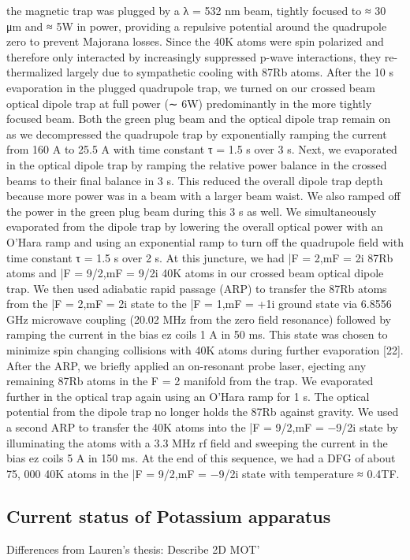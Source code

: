 the magnetic trap was plugged by a λ = 532 nm beam, tightly focused to ≈ 30 μm
and ≈ 5W in power, providing a repulsive potential around the quadrupole
zero to prevent Majorana losses. Since the 40K atoms were spin polarized and
therefore only interacted by increasingly suppressed p-wave interactions, they
re-thermalized largely due to sympathetic cooling with 87Rb atoms.
After the 10 s evaporation in the plugged quadrupole trap, we turned on
our crossed beam optical dipole trap at full power (∼ 6W) predominantly in
the more tightly focused beam. Both the green plug beam and the optical
dipole trap remain on as we decompressed the quadrupole trap by exponentially
ramping the current from 160 A to 25.5 A with time constant τ = 1.5 s
over 3 s. Next, we evaporated in the optical dipole trap by ramping the relative
power balance in the crossed beams to their final balance in 3 s. This reduced
the overall dipole trap depth because more power was in a beam with a larger
beam waist. We also ramped off the power in the green plug beam during this
3 s as well. We simultaneously evaporated from the dipole trap by lowering
the overall optical power with an O’Hara ramp and using an exponential ramp
to turn off the quadrupole field with time constant τ = 1.5 s over 2 s. At this
juncture, we had |F = 2,mF = 2i 87Rb atoms and |F = 9/2,mF = 9/2i 40K atoms in
our crossed beam optical dipole trap.
We then used adiabatic rapid passage (ARP) to transfer the 87Rb atoms from
the |F = 2,mF = 2i state to the |F = 1,mF = +1i ground state via 6.8556 GHz microwave
coupling (20.02 MHz from the zero field resonance) followed by ramping
the current in the bias ez coils 1 A in 50 ms. This state was chosen to minimize
spin changing collisions with 40K atoms during further evaporation [22]. After
the ARP, we briefly applied an on-resonant probe laser, ejecting any remaining
87Rb atoms in the F = 2 manifold from the trap. We evaporated further in the
optical trap again using an O’Hara ramp for 1 s. The optical potential from the
dipole trap no longer holds the 87Rb against gravity. We used a second ARP to
transfer the 40K atoms into the |F = 9/2,mF = −9/2i state by illuminating the
atoms with a 3.3 MHz rf field and sweeping the current in the bias ez coils 5 A in
150 ms. At the end of this sequence, we had a DFG of about 75, 000 40K atoms in
the |F = 9/2,mF = −9/2i state with temperature ≈ 0.4TF.

\subsection{Current status of Potassium apparatus}
Differences from Lauren's thesis:
	    Describe 2D MOT'